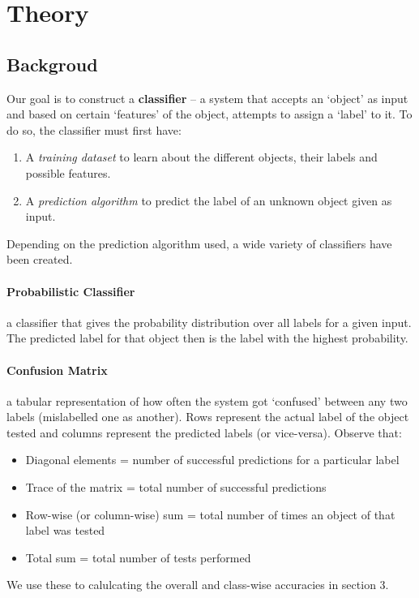 

\section{Theory}

\subsection{Backgroud}
Our goal is to construct a \textbf{classifier} -- a system that accepts an `object' as input and based on certain `features' of the object, attempts to assign a `label' to it.
To do so, the classifier must first have:
\begin{enumerate}[label={\roman*)}, nosep, topsep=0pt]
	\item A \textit{training dataset} to learn about the different objects, their labels and possible features.
	\item A \textit{prediction algorithm} to predict the label of an unknown object given as input.
\end{enumerate}
Depending on the prediction algorithm used, a wide variety of classifiers have been created.

\paragraph{Probabilistic Classifier} a classifier that gives the probability distribution over all labels for a given input. The predicted label for that object then is the label with the highest probability.

\paragraph{Confusion Matrix} a tabular representation of how often the system got `confused' between any two labels (mislabelled one as another). Rows represent the actual label of the object tested  and columns represent the predicted labels (or vice-versa). 
Observe that:
\begin{itemize}[nosep]
	\item Diagonal elements = number of successful predictions for a particular label
	\item Trace of the matrix = total number of successful predictions  
	\item Row-wise (or column-wise) sum = total number of times an object of that label was tested
	\item Total sum = total number of tests performed
\end{itemize}
We use these to calulcating the overall and class-wise accuracies in section 3.


